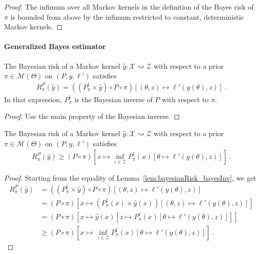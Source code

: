 \begin{proof}%
\uses{}
The infimum over all Markov kernels in the definition of the Bayes risk of $\pi$ is bounded from above by the infimum restricted to constant, deterministic Markov kernels.
\end{proof}

\paragraph{Generalized Bayes estimator}

\begin{lemma}
  \label{lem:bayesianRisk_bayesInv}
  The Bayesian risk of a Markov kernel $\hat{y} : \mathcal X \rightsquigarrow \mathcal Z$ with respect to a prior $\pi \in \mathcal M(\Theta)$ on $(P, y, \ell')$ satisfies
  \begin{align*}
  R^P_\pi(\hat{y}) = ((P_\pi^\dagger \times \hat{y}) \circ P \circ \pi)\left[(\theta, z) \mapsto \ell'(y(\theta), z)\right] \: .
  \end{align*}
  In that expression, $P_\pi^\dagger$ is the Bayesian inverse of $P$ with respect to $\pi$.
\end{lemma}

\begin{proof}%
\uses{}
Use the main property of the Bayesian inverse.
\end{proof}

\begin{lemma}
  \label{lem:bayesianRisk_ge_inf_bayesInv}
  The Bayesian risk of a Markov kernel $\hat{y} : \mathcal X \rightsquigarrow \mathcal Z$ with respect to a prior $\pi \in \mathcal M(\Theta)$ on $(P, y, \ell')$ satisfies
  \begin{align*}
  R^P_\pi(\hat{y}) \ge (P \circ \pi)\left[x \mapsto \inf_{z \in \mathcal Z} P_\pi^\dagger(x) \left[\theta \mapsto \ell'(y(\theta), z)\right]\right] \: .
  \end{align*}
\end{lemma}

\begin{proof}%
{}
Starting from the equality of Lemma~\ref{lem:bayesianRisk_bayesInv}, we get
\begin{align*}
R^P_\pi(\hat{y})
&= ((P_\pi^\dagger \times \hat{y}) \circ P \circ \pi)\left[(\theta, z) \mapsto \ell'(y(\theta), z)\right]
\\
&= (P \circ \pi)\left[x \mapsto (P_\pi^\dagger(x) \times \hat{y}(x)) \left[(\theta, z) \mapsto \ell'(y(\theta), z)\right]\right]
\\
&= (P \circ \pi)\left[x \mapsto \hat{y}(x)\left[z \mapsto P_\pi^\dagger(x) \left[\theta \mapsto \ell'(y(\theta), z)\right]\right]\right]
\\
&\ge (P \circ \pi)\left[x \mapsto \inf_{z \in \mathcal Z} P_\pi^\dagger(x) \left[\theta \mapsto \ell'(y(\theta), z)\right]\right]
\: .
\end{align*}

\end{proof}

